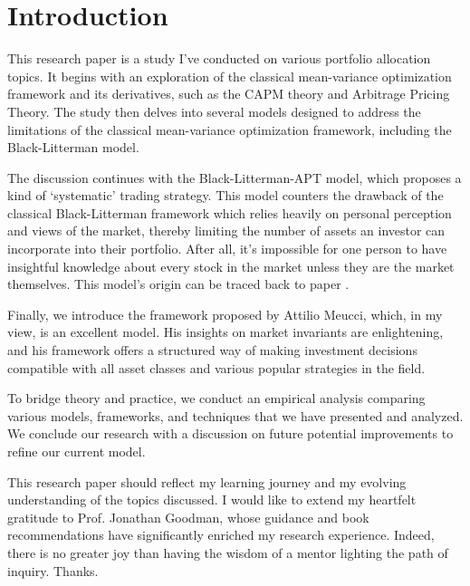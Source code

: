 \documentclass[13pt]{article}
\theoremstyle{definition}
\theoremstyle{remark}
\begin{document}
\begin{center}
    
    {}


\end{center}

\tableofcontents
\newpage
\vspace{2em}


\section{Introduction}

This research paper is a study I've conducted on various portfolio allocation topics. It begins with an exploration of the classical mean-variance optimization framework and its derivatives, such as the CAPM theory and Arbitrage Pricing Theory. The study then delves into several models designed to address the limitations of the classical mean-variance optimization framework, including the Black-Litterman model.

The discussion continues with the Black-Litterman-APT model, which proposes a kind of `systematic' trading strategy. This model counters the drawback of the classical Black-Litterman framework which relies heavily on personal perception and views of the market, thereby limiting the number of assets an investor can incorporate into their portfolio. After all, it's impossible for one person to have insightful knowledge about every stock in the market unless they are the market themselves. This model's origin can be traced back to paper \cite{kolm2017}.

Finally, we introduce the framework proposed by Attilio Meucci, which, in my view, is an excellent model. His insights on market invariants are enlightening, and his framework offers a structured way of making investment decisions compatible with all asset classes and various popular strategies in the field.

To bridge theory and practice, we conduct an empirical analysis comparing various models, frameworks, and techniques that we have presented and analyzed. We conclude our research with a discussion on future potential improvements to refine our current model.

This research paper should reflect my learning journey and my evolving understanding of the topics discussed. I would like to extend my heartfelt gratitude to Prof. Jonathan Goodman, whose guidance and book recommendations have significantly enriched my research experience. Indeed, there is no greater joy than having the wisdom of a mentor lighting the path of inquiry. Thanks.
\end{document}
